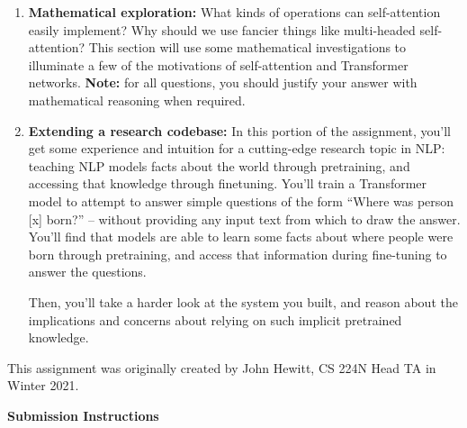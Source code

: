 \documentclass[answers]{exam}
\begin{document}
    \begin{enumerate}
        \item \textbf{Mathematical exploration:}  What kinds of operations can self-attention easily implement? Why should we use fancier things like multi-headed self-attention?
        This section will use some mathematical investigations to illuminate a few of the motivations of self-attention and Transformer networks.
            {\color{red} \textbf{Note:} for all questions, you should justify your answer with mathematical reasoning when required.}
        \item \textbf{Extending a research codebase:}
        In this portion of the assignment, you'll get some experience and intuition for a cutting-edge research topic in NLP: teaching NLP models facts about the world through pretraining, and accessing that knowledge through finetuning.
        You'll train a Transformer model to attempt to answer simple questions of the form ``Where was person [x] born?'' -- without providing any input text from which to draw the answer.
        You'll find that models are able to learn some facts about where people were born through pretraining, and access that information during fine-tuning to answer the questions.

        Then, you'll take a harder look at the system you built, and reason about the implications and concerns about relying on such implicit pretrained knowledge.

    \end{enumerate}

    This assignment was originally created by John Hewitt, CS 224N Head TA in Winter 2021.



    \newpage

    \begin{questions}
        
        
    \end{questions}

    \Large{\textbf{Submission Instructions}}
\end{document}
